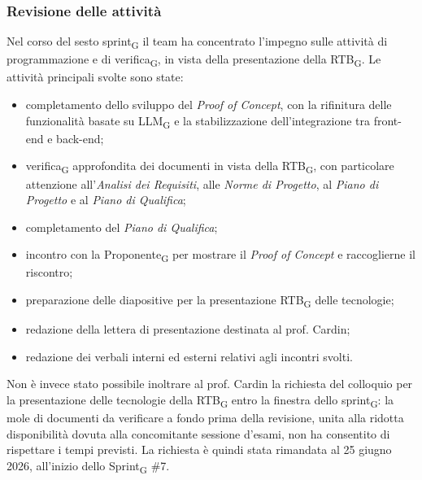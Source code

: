 ﻿\documentclass[a4paper, 10pt, colorlinks=true, linkcolor=black, urlcolor=blue, citecolor=blue, hidelinks]{article}
\begin{document}
\subsubsection{Revisione delle attività}
Nel corso del sesto sprint\textsubscript{G} il team ha concentrato l'impegno sulle attività di programmazione e di verifica\textsubscript{G}, in vista della presentazione della RTB\textsubscript{G}. Le attività principali svolte sono state:
\begin{itemize}
    \item completamento dello sviluppo del \textit{Proof of Concept}, con la rifinitura delle funzionalità basate su LLM\textsubscript{G} e la stabilizzazione dell'integrazione tra front-end e back-end;
    \item verifica\textsubscript{G} approfondita dei documenti in vista della RTB\textsubscript{G}, con particolare attenzione all'\textit{Analisi dei Requisiti}, alle \textit{Norme di Progetto}, al \textit{Piano di Progetto} e al \textit{Piano di Qualifica};
    \item completamento del \textit{Piano di Qualifica};
    \item incontro con la Proponente\textsubscript{G} per mostrare il \textit{Proof of Concept} e raccoglierne il riscontro;
    \item preparazione delle diapositive per la presentazione RTB\textsubscript{G} delle tecnologie;
    \item redazione della lettera di presentazione destinata al prof. Cardin;
    \item redazione dei verbali interni ed esterni relativi agli incontri svolti.
\end{itemize}

Non è invece stato possibile inoltrare al prof. Cardin la richiesta del colloquio per la presentazione delle tecnologie della RTB\textsubscript{G} entro la finestra dello sprint\textsubscript{G}: la mole di documenti da verificare a fondo prima della revisione, unita alla ridotta disponibilità dovuta alla concomitante sessione d'esami, non ha consentito di rispettare i tempi previsti. La richiesta è quindi stata rimandata al 25 giugno 2026, all'inizio dello Sprint\textsubscript{G} \#7.
\end{document}
